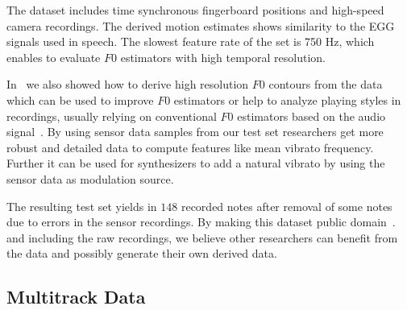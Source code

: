 \par
The dataset includes time synchronous fingerboard positions and high-speed camera recordings. 
The derived motion estimates shows similarity to the EGG signals used in speech. 
The slowest feature rate of the set is 750 Hz, which enables to evaluate $F0$ estimators with high temporal resolution. 
\par
In~\cite{stoeter15acm} we also showed how to derive high resolution $F0$ contours from the data which can be used to improve $F0$ estimators or help to analyze playing styles in recordings, usually relying on conventional $F0$ estimators based on the audio signal~\cite{mellody2000time}. 
By using sensor data samples from our test set researchers get more robust and detailed data to compute features like mean vibrato frequency. 
Further it can be used for synthesizers to add a natural vibrato by using the sensor data as modulation source.
\par
The resulting test set yields in $148$ recorded notes after removal of some notes due to errors in the sensor recordings.
By making this dataset public domain~\cite{oss_muserc}. and including the raw recordings, we believe other researchers can benefit from the data and possibly generate their own derived data.

\subsection{Multitrack Data}


